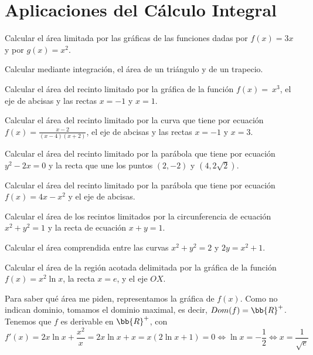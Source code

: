 \section{Aplicaciones del Cálculo Integral}

\begin{ejercicio}
    Calcular el área limitada por las gráficas de las funciones dadas por $f(x)=3x$ y por $g(x)=x^2$.
\end{ejercicio}

\begin{ejercicio}
    Calcular mediante integración, el área de un triángulo y de un trapecio.
\end{ejercicio}

\begin{ejercicio}
    Calcular el área del recinto limitado por la gráfica de la función $f(x)=~x^3$, el eje de abcisas y las rectas $x=-1$ y $x=1$.
\end{ejercicio}

\begin{ejercicio}
    Calcular el área del recinto limitado por la curva que tiene por ecuación $f(x)=\frac{x-2}{(x-4)(x+2)}$, el eje de abcisas y las rectas $x=-1$ y $x=3$.
\end{ejercicio}

\begin{ejercicio}
    Calcular el área del recinto limitado por la parábola que tiene por ecuación $y^2-2x=0$ y la recta que une los puntos $(2,-2)$ y $(4,2\sqrt{2})$.
\end{ejercicio}

\begin{ejercicio}
    Calcular el área del recinto limitado por la parábola que tiene por ecuación $f(x)=4x-x^2$ y el eje de abcisas.
\end{ejercicio}

\begin{ejercicio}
    Calcular el área de los recintos limitados por la circunferencia de ecuación $x^2+y^2=1$ y la recta de ecuación $x+y=1$.
\end{ejercicio}

\begin{ejercicio}
    Calcular el área comprendida entre las curvas $x^2+y^2=2$ y $2y=x^2+1$.
\end{ejercicio}

\begin{ejercicio}
    Calcular el área de la región acotada delimitada por la gráfica de la función $f(x)=x^2\ln x$, la recta $x=e$, y el eje $OX$.

    Para saber qué área me piden, representamos la gráfica de $f(x)$. Como no indican dominio, tomamos el dominio maximal, es decir, $Dom(f)=\bb{R}^+$. Tenemos que $f$ es derivable en $\bb{R}^+$, con
    \begin{equation*}
        f'(x)=2x\ln x +\frac{x^2}{x} = 2x\ln x +x = x(2\ln x +1)=0\Longleftrightarrow \ln x = -\frac{1}{2} \Longleftrightarrow x = \frac{1}{\sqrt{e}}
    \end{equation*}
\end{ejercicio}

